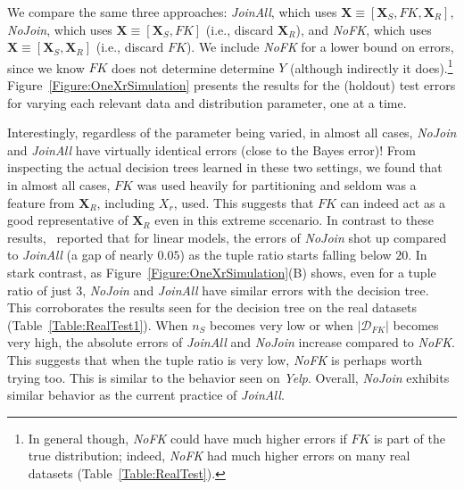\documentclass{vldb}
\begin{document}
We compare the same three approaches: \textit{JoinAll}, which uses $\textbf{X} \equiv [\textbf{X}_S, FK, \textbf{X}_R]$, 
\textit{NoJoin}, which uses $\textbf{X} \equiv [\textbf{X}_S, FK]$ (i.e., discard $\textbf{X}_R$), and \textit{NoFK}, 
which uses $\textbf{X} \equiv [\textbf{X}_S, \textbf{X}_R]$ (i.e., discard $FK$).
We include \textit{NoFK} for a lower bound on errors, since we know $FK$ does not determine determine $Y$ (although indirectly it 
does).\footnote{In general though, \textit{NoFK} could have much higher errors if $FK$ is part of the true distribution; indeed, \textit{NoFK} had 
much higher errors on many real datasets (Table~\ref{Table:RealTest}).}
Figure~\ref{Figure:OneXrSimulation} presents the results for the (holdout) test errors for varying each relevant data and distribution parameter, one at a time.

Interestingly, regardless of the parameter being varied, in almost all cases, \textit{NoJoin} and \textit{JoinAll} have virtually identical errors (close to the Bayes 
error)! From inspecting the actual decision trees learned in these two settings, we found that in almost all cases, $FK$ was used heavily for partitioning and seldom was 
a feature from $\textbf{X}_R$, including $X_r$, used. This suggests that $FK$ can indeed act as a good representative of $\textbf{X}_R$ even in this extreme sccenario. 
In contrast to these results,~\cite{hamlet} reported that for linear models, the errors of \textit{NoJoin} shot up compared to \textit{JoinAll} (a gap of nearly $0.05$)
as the tuple ratio starts falling below $20$. In stark contrast, as Figure~\ref{Figure:OneXrSimulation}(B) shows, even for a tuple ratio of just $3$, \textit{NoJoin} 
and \textit{JoinAll} have similar errors with the decision tree. This corroborates the results seen for the decision tree on the real datasets (Table~\ref{Table:RealTest1}).
When $n_S$ becomes very low or when $|\mathcal{D}_{FK}|$ becomes very high, the absolute errors of \textit{JoinAll} and \textit{NoJoin} increase compared to \textit{NoFK}. 
This suggests that when the tuple ratio is very low, \textit{NoFK} is perhaps worth trying too. This is similar to the behavior seen on \textit{Yelp}. 
Overall, \textit{NoJoin} exhibits similar behavior as the current practice of \textit{JoinAll}.
\end{document}
